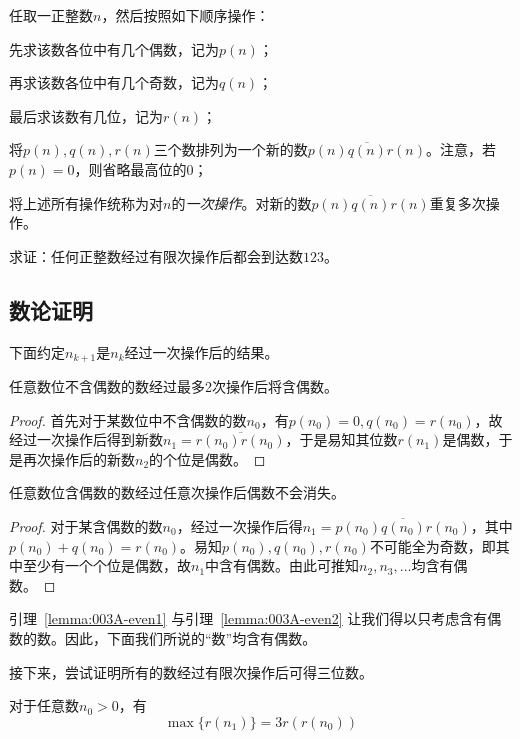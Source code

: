 

任取一正整数$n$，然后按照如下顺序操作：

先求该数各位中有几个偶数，记为$p(n)$；

再求该数各位中有几个奇数，记为$q(n)$；

最后求该数有几位，记为$r(n)$；

将$p(n), q(n), r(n)$三个数排列为一个新的数$\overline{p(n)q(n)r(n)}$。注意，若$p(n) = 0$，则省略最高位的$0$；

将上述所有操作统称为对$n$的\emph{一次操作}。对新的数$\overline{p(n)q(n)r(n)}$重复多次操作。

求证：任何正整数经过有限次操作后都会到达数$123$。

\subsection{数论证明}

下面约定$n_{k + 1}$是$n_k$经过一次操作后的结果。

\begin{lemma} \label{lemma:003A-even1}
  任意数位不含偶数的数经过最多2次操作后将含偶数。
\end{lemma}

\begin{proof}
  首先对于某数位中不含偶数的数$n_0$，有$p(n_0) = 0, q(n_0) = r(n_0)$，故经过一次操作后得到新数$n_1 = \overline{r(n_0)r(n_0)}$，于是易知其位数$r(n_1)$是偶数，于是再次操作后的新数$n_2$的个位是偶数。
\end{proof}

\begin{lemma} \label{lemma:003A-even2}
  任意数位含偶数的数经过任意次操作后偶数不会消失。
\end{lemma}

\begin{proof}
  对于某含偶数的数$n_0$，经过一次操作后得$n_1 = \overline{p(n_0)q(n_0)r(n_0)}$，其中$p(n_0) + q(n_0) = r(n_0)$。易知$p(n_0), q(n_0), r(n_0)$不可能全为奇数，即其中至少有一个个位是偶数，故$n_1$中含有偶数。由此可推知$n_2, n_3, \dots$均含有偶数。
\end{proof}

引理~\ref{lemma:003A-even1} 与引理~\ref{lemma:003A-even2} 让我们得以只考虑含有偶数的数。因此，下面我们所说的“数”均含有偶数。

接下来，尝试证明所有的数经过有限次操作后可得三位数。

\begin{lemma} \label{lemma:003A-rn13rrn0}
  对于任意数$n_0 > 0$，有
  \[ \max\{r(n_1)\} = 3r(r(n_0)) \]
\end{lemma}

